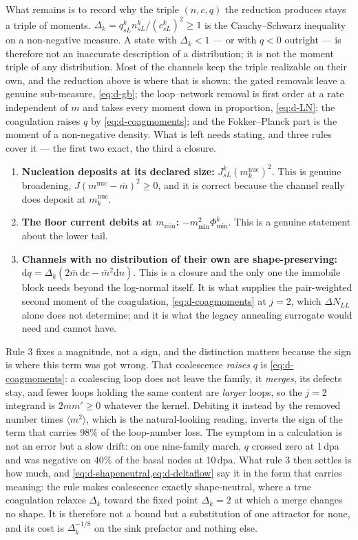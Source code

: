 What remains is to record why the triple $(n,c,q)$ the reduction produces stays
a triple of moments. $\Delta_k=q^k_{sL}n^k_{sL}/(c^k_{sL})^{2}\ge1$ is the
Cauchy--Schwarz inequality on a non-negative measure. A state with $\Delta_k<1$
--- or with $q<0$ outright --- is therefore not an inaccurate description of a
distribution; it is not the moment triple of any distribution. Most of the
channels keep the triple realizable on their own, and the reduction above is
where that is shown: the gated removals leave a genuine sub-measure,
\cref{eq:d-gb}; the loop--network removal is first order at a rate independent
of $m$ and takes every moment down in proportion, \cref{eq:d-LN}; the
coagulation raises $q$ by \cref{eq:d-coagmoments}; and the Fokker--Planck part
is the moment of a non-negative density. What is left needs stating, and three
rules cover it --- the first two exact, the third a closure.

\begin{enumerate}[itemsep=3pt]
\item \textbf{Nucleation deposits at its declared size:} $J^k_{sL}
      (m^{\mathrm{nuc}}_k)^{2}$. This is genuine broadening,
      $J(m^{\mathrm{nuc}}-\bar m)^{2}\ge0$, and it is correct because the channel
      really does deposit at $m^{\mathrm{nuc}}_k$.
\item \textbf{The floor current debits at $m_{\min}$:}
      $-m_{\min}^{2}\Phi^k_{\min}$. This is a genuine statement about the lower
      tail.
\item \textbf{Channels with no distribution of their own are
      shape-preserving:} $\mathrm dq=\Delta_k(2\bar m\,\mathrm dc
      -\bar m^{2}\mathrm dn)$. This is a closure and the only one the immobile
      block needs beyond the log-normal itself. It is what supplies the
      pair-weighted second moment of the coagulation,
      \cref{eq:d-coagmoments} at $j=2$, which $\Delta N_{LL}$ alone does not
      determine; and it is what the legacy annealing surrogate would need and
      cannot have.
\end{enumerate}

Rule 3 fixes a magnitude, not a sign, and the distinction matters because the
sign is where this term was got wrong. That coalescence \emph{raises} $q$ is
\cref{eq:d-coagmoments}: a coalescing loop does not leave the family, it
\emph{merges}, its defects stay, and fewer loops holding the same content are
\emph{larger} loops, so the $j=2$ integrand is $2mm'\ge0$ whatever the kernel.
Debiting it instead by the removed number times $\langle m^{2}\rangle$, which is
the natural-looking reading, inverts the sign of the term that carries $98\%$ of
the loop-number loss. The symptom in a calculation is not an error but a slow
drift: on one nine-family march, $q$ crossed zero at 1\,dpa and was negative on
$40\%$ of the basal nodes at 10\,dpa. What rule 3 then settles is how much, and
\cref{eq:d-shapeneutral,eq:d-deltaflow} say it in the form that carries meaning:
the rule makes coalescence exactly shape-neutral, where a true coagulation
relaxes $\Delta_k$ toward the fixed point $\Delta_k=2$ at which a merge changes
no shape. It is therefore not a bound but a substitution of one attractor for
none, and its cost is $\Delta_k^{-1/8}$ on the sink prefactor and nothing else.

